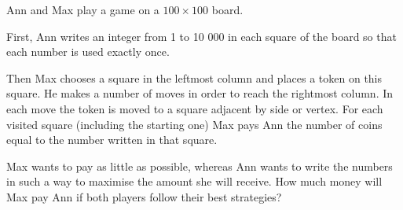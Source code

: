 Ann and Max play a game on a $100 \times 100$ board.

First, Ann writes an integer from 1 to 10 000 in each square of the board so that each number is used exactly once.

Then Max chooses a square in the leftmost column and places a token on this square. He makes a number of moves in order to reach the rightmost column. In each move the token is moved to a square adjacent by side or vertex. For each visited square (including the starting one) Max pays Ann the number of coins equal to the number written in that square.

Max wants to pay as little as possible, whereas Ann wants to write the numbers in such a way to maximise the amount she will receive. How much money will Max pay Ann if both players follow their best strategies?
